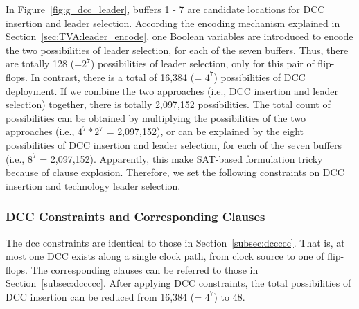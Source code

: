 In Figure~\ref{fig:g_dcc_leader}, buffers 1 - 7 are candidate locations for DCC insertion and leader selection. According the encoding mechanism explained in Section~\ref{sec:TVA:leader_encode}, one Boolean variables are introduced to encode the two possibilities of leader selection, for each of the seven buffers. Thus, there are totally 128 (=$2^7$) possibilities of leader selection, only for this pair of flip-flops. In contrast, there is a total of 16,384 (= $4^7$) possibilities of DCC  deployment. If we combine the two approaches (i.e., DCC insertion and leader selection) together, there is totally 2,097,152 possibilities. The total count of possibilities can be obtained by multiplying the possibilities of the two approaches (i.e., $4^7*2^7$ = 2,097,152), or can be explained by the eight possibilities of DCC insertion and leader selection, for each of the seven buffers (i.e., $8^7$ = 2,097,152). Apparently, this make SAT-based formulation tricky because of clause explosion. Therefore, we set the following constraints on DCC insertion and technology leader selection.

\subsubsection{DCC Constraints and Corresponding Clauses}
\label{sec:TVA:dcc_c}
The dcc constraints are identical to those in Section~\ref{subsec:dccccc}. That is, at most one DCC exists along a single clock path, from clock source to one of flip-flops. The corresponding clauses can be referred to those in Section~\ref{subsec:dccccc}. After applying DCC constraints, the total possibilities of DCC insertion can be reduced from 16,384 (= $4^7$) to 48. 

